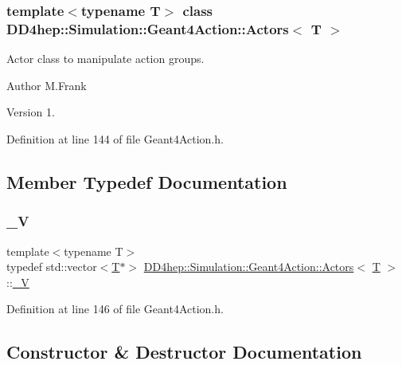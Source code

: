 \subsubsection*{template$<$typename T$>$\newline
class D\+D4hep\+::\+Simulation\+::\+Geant4\+Action\+::\+Actors$<$ T $>$}

Actor class to manipulate action groups. 

\begin{DoxyAuthor}{Author}
M.\+Frank 
\end{DoxyAuthor}
\begin{DoxyVersion}{Version}
1. 
\end{DoxyVersion}


Definition at line 144 of file Geant4\+Action.\+h.



\subsection{Member Typedef Documentation}
\hypertarget{class_d_d4hep_1_1_simulation_1_1_geant4_action_1_1_actors_a18b6dfb1542a2cd036d8317db48f6c16}{}\label{class_d_d4hep_1_1_simulation_1_1_geant4_action_1_1_actors_a18b6dfb1542a2cd036d8317db48f6c16} 
\subsubsection{\texorpdfstring{\+\_\+V}{\_V}}
{\footnotesize\ttfamily template$<$typename T$>$ \\
typedef std\+::vector$<$\hyperlink{class_t}{T}$\ast$$>$ \hyperlink{class_d_d4hep_1_1_simulation_1_1_geant4_action_1_1_actors}{D\+D4hep\+::\+Simulation\+::\+Geant4\+Action\+::\+Actors}$<$ \hyperlink{class_t}{T} $>$\+::\hyperlink{class_d_d4hep_1_1_simulation_1_1_geant4_action_1_1_actors_a18b6dfb1542a2cd036d8317db48f6c16}{\+\_\+V}}



Definition at line 146 of file Geant4\+Action.\+h.



\subsection{Constructor \& Destructor Documentation}
\hypertarget{class_d_d4hep_1_1_simulation_1_1_geant4_action_1_1_actors_af8c90e54776c4e396fbce217553611ec}{}\label{class_d_d4hep_1_1_simulation_1_1_geant4_action_1_1_actors_af8c90e54776c4e396fbce217553611ec} 
